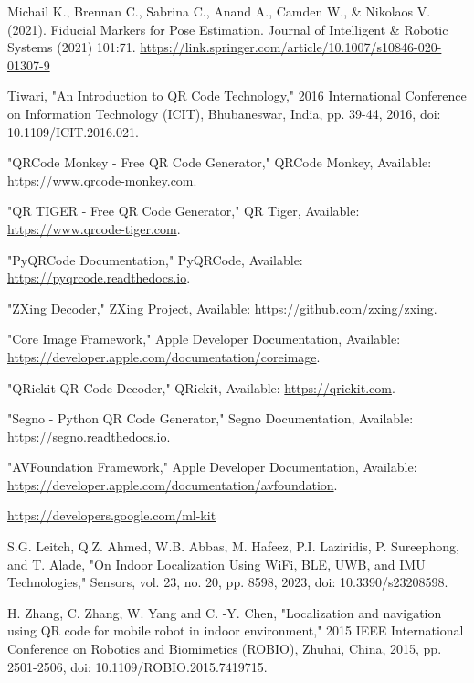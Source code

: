 
\newpage
{}
\renewcommand{\bibname}{References}

\begin{thebibliography}{9}
	Michail K., Brennan C., Sabrina C., Anand A., Camden W., \& Nikolaos
	V. (2021). Fiducial Markers for Pose Estimation. Journal of Intelligent \&
	Robotic Systems (2021) 101:71.
	\url{https://link.springer.com/article/10.1007/s10846-020-01307-9}
		
	 Tiwari, "An Introduction to QR Code Technology," 2016 International Conference on Information Technology (ICIT), Bhubaneswar, India, pp. 39-44, 2016, doi: 10.1109/ICIT.2016.021.
	
	 "QRCode Monkey - Free QR Code Generator," QRCode Monkey, Available:
	\url{https://www.qrcode-monkey.com}.
	
	 "QR TIGER - Free QR Code Generator," QR Tiger, Available: \url{https://www.qrcode-tiger.com}.
	
	 "PyQRCode Documentation," PyQRCode, Available: \url{https://pyqrcode.readthedocs.io}.
	
	 "ZXing Decoder," ZXing Project, Available: \url{https://github.com/zxing/zxing}.
	
	 "Core Image Framework," Apple Developer Documentation, Available: \url{https://developer.apple.com/documentation/coreimage}.
	
	 "QRickit QR Code Decoder," QRickit, Available: \url{https://qrickit.com}.
	
	 "Segno - Python QR Code Generator," Segno Documentation, Available: \url{https://segno.readthedocs.io}.
	
	 "AVFoundation Framework," Apple Developer Documentation, Available: \url{https://developer.apple.com/documentation/avfoundation}.
	
	\url{https://developers.google.com/ml-kit}
	
	 S.G. Leitch, Q.Z. Ahmed, W.B. Abbas, M. Hafeez, P.I. Laziridis, P. Sureephong, and T. Alade, "On Indoor Localization Using WiFi, BLE, UWB, and IMU Technologies," Sensors, vol. 23, no. 20, pp. 8598, 2023, doi: 10.3390/s23208598.
	
	H. Zhang, C. Zhang, W. Yang and C. -Y. Chen, "Localization and navigation using QR code for mobile robot in indoor environment," 2015 IEEE International Conference on Robotics and Biomimetics (ROBIO), Zhuhai, China, 2015, pp. 2501-2506, doi: 10.1109/ROBIO.2015.7419715.


\end{thebibliography}
